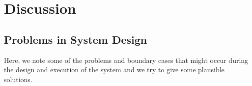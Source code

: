 
\chapter{Discussion} %

\label{Chapter 4} %


\section{Problems in System Design}

Here, we note some of the problems and boundary cases that might occur during the design and execution of the system and we try to give some plausible solutions.

